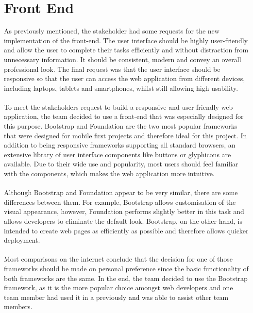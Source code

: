 \documentclass{l3proj}
\begin{document}
\section{Front End}
As previously mentioned, the stakeholder had some requests for the new implementation of the front-end. The user interface should be highly user-friendly and allow the user to complete their tasks efficiently and without distraction from unnecessary information. It should be consistent, modern and convey an overall professional look. The final request was that the user interface should be responsive so that the user can access the web application from different devices, including laptops, tablets and smartphones, whilst still allowing high usability.\\
\\To meet the stakeholders request to build a responsive and user-friendly web application, the team decided to use a front-end that was especially designed for this purpose. Bootstrap and Foundation are the two most popular frameworks that were designed for mobile first projects and therefore ideal for this project. In addition to being responsive frameworks supporting all standard browsers, an extensive library of user interface components like buttons or glyphicons are available. Due to their wide use and popularity, most users should feel familiar with the components, which makes the web application more intuitive.\\
\\Although Bootstrap and Foundation appear to be very similar, there are some differences between them. For example, Bootstrap allows customisation of the visual appearance, however, Foundation performs slightly better in this task and allows developers to eliminate the default look. Bootstrap, on the other hand, is intended to create web pages as efficiently as possible and therefore allows quicker deployment.\\
\\ Most comparisons on the internet conclude that the decision for one of those frameworks should be made on personal preference since the basic functionality of both frameworks are the same. In the end, the team decided to use the Bootstrap framework, as it is the more popular choice amongst web developers and one team member had used it in a previously and was able to assist other team members.
\end{document}
